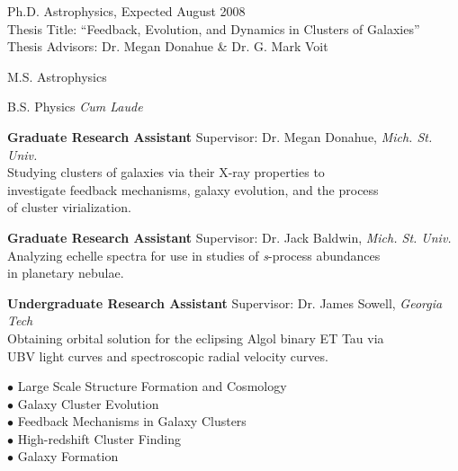 \documentclass[11pt]{cv}
\begin{document}
\begin{llist}


Ph.D. Astrophysics, Expected August 2008\\
Thesis Title: ``Feedback, Evolution, and Dynamics in Clusters of Galaxies''\\
Thesis Advisors: Dr. Megan Donahue \& Dr. G. Mark Voit

M.S. Astrophysics

B.S. Physics {\it Cum Laude}


{\sc \bf{Graduate Research Assistant}}
Supervisor: Dr. Megan Donahue, {\textit{Mich. St. Univ.}}\\
Studying clusters of galaxies via their X-ray properties to\\
investigate feedback mechanisms, galaxy evolution, and the process\\
of cluster virialization.

{\sc \bf{Graduate Research Assistant}}
Supervisor: Dr. Jack Baldwin, {\textit{Mich. St. Univ.}}\\
Analyzing echelle spectra for use in studies of {\textit{s}}-process abundances\\
in planetary nebulae.

{\sc \bf{Undergraduate Research Assistant}}
Supervisor: Dr. James Sowell, {\textit{Georgia Tech}}\\
Obtaining orbital solution for the eclipsing Algol binary ET Tau via\\
UBV light curves and spectroscopic radial velocity curves.


{\sc $\bullet$ Large Scale Structure Formation and Cosmology}\\
{\sc $\bullet$ Galaxy Cluster Evolution}\\
{\sc $\bullet$ Feedback Mechanisms in Galaxy Clusters}\\
{\sc $\bullet$ High-redshift Cluster Finding}\\
{\sc $\bullet$ Galaxy Formation}


\end{llist}
\end{document}
